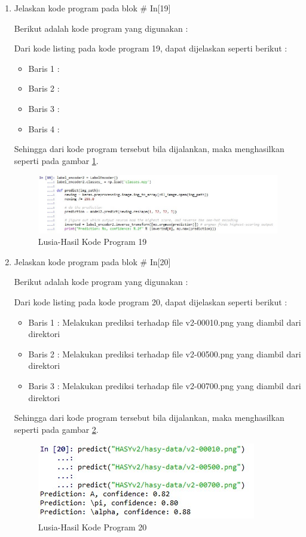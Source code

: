 \begin{enumerate}
\item Jelaskan kode program pada blok \# In[19]
	\par Berikut adalah kode program yang digunakan :
	
	\par Dari kode listing pada kode program 19, dapat dijelaskan seperti berikut :
	\begin{itemize}
	\item Baris 1	: 
	\item Baris 2	: 
	\item Baris 3	: 
	\item Baris 4	: 
	\end{itemize}
	\par Sehingga dari kode program tersebut bila dijalankan, maka menghasilkan seperti pada gambar \ref{7B19}.
		\begin{figure}[!hbtp]
		\centering
		\includegraphics[scale=0.5]{figures/w19.jpg}
		\caption{Lusia-Hasil Kode Program 19}
		\label{7B19}
		\end{figure}
		
\item Jelaskan kode program pada blok \# In[20]
	\par Berikut adalah kode program yang digunakan :
	
	\par Dari kode listing pada kode program 20, dapat dijelaskan seperti berikut :
	\begin{itemize}
	\item Baris 1	: Melakukan prediksi terhadap file v2-00010.png yang diambil dari direktori
	\item Baris 2	: Melakukan prediksi terhadap file v2-00500.png yang diambil dari direktori
	\item Baris 3	: Melakukan prediksi terhadap file v2-00700.png yang diambil dari direktori
	\end{itemize}
	\par Sehingga dari kode program tersebut bila dijalankan, maka menghasilkan seperti pada gambar \ref{7B20}.
		\begin{figure}[!hbtp]
		\centering
		\includegraphics[scale=0.5]{figures/w20.jpg}
		\caption{Lusia-Hasil Kode Program 20}
		\label{7B20}
		\end{figure}

\end{enumerate}

